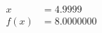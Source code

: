 \documentclass[preview]{standalone}
\begin{document}
\begin{align*}
x &= 4.9999\\f(x) &= 8.0000000
\end{align*}
\end{document}
